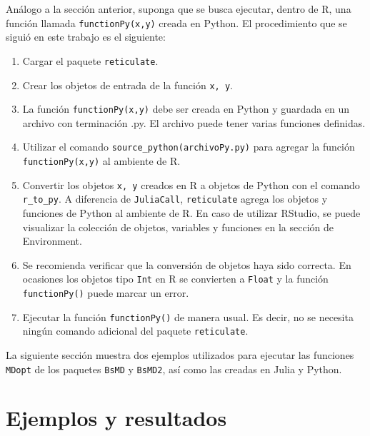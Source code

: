 Análogo a la sección anterior, suponga que se busca ejecutar, dentro de \textsf{R}, una función llamada \texttt{functionPy(x,y)} creada en \textsf{Python}. El procedimiento que se siguió en este trabajo es el siguiente: 

\begin{enumerate}
	\item Cargar el paquete \texttt{reticulate}.
	
	\item Crear los objetos de entrada de la función \texttt{x, y}.
	
	\item La función \texttt{functionPy(x,y)} debe ser creada en \textsf{Python} y guardada en un archivo con terminación \textsf{.py}. El archivo puede tener varias funciones definidas. 
	
	\item Utilizar el comando \texttt{source\_python(archivoPy.py)} para agregar la función \texttt{functionPy(x,y)} al ambiente de \textsf{R}.
	
	\item Convertir los objetos \texttt{x, y} creados en \textsf{R} a objetos de \textsf{Python} con el comando \texttt{r\_to\_py}. A diferencia de \texttt{JuliaCall}, \texttt{reticulate} agrega los objetos y funciones de \textsf{Python} al ambiente de \textsf{R}. En caso de utilizar \textsf{RStudio}, se puede visualizar la colección de objetos, variables y funciones en la sección de \textsf{Environment}. 
	
	\item Se recomienda verificar que la conversión de objetos haya sido correcta. En ocasiones los objetos tipo \texttt{Int} en \textsf{R} se convierten a \texttt{Float} y la función \texttt{functionPy()} puede marcar un error. 
	
	\item Ejecutar la función \texttt{functionPy()} de manera usual. Es decir, no se necesita ningún comando adicional del paquete \texttt{reticulate}. 
	
	
\end{enumerate}

La siguiente sección muestra dos ejemplos utilizados para ejecutar las funciones \texttt{MDopt} de los paquetes \texttt{BsMD} y \texttt{BsMD2}, así como las creadas en \textsf{Julia} y \textsf{Python}. 

\section{Ejemplos y resultados}

